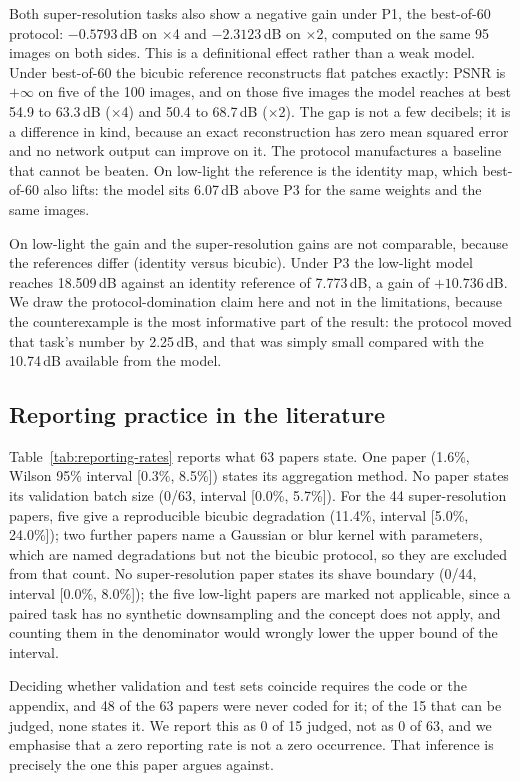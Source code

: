 \documentclass[10pt,twocolumn]{article}
\begin{document}
Both super-resolution tasks also show a negative gain under P1, the
best-of-60 protocol: $-0.5793$\,dB on $\times$4 and $-2.3123$\,dB on
$\times$2, computed on the same 95 images on both sides. This is a
definitional effect rather than a weak model. Under best-of-60 the bicubic
reference reconstructs flat patches exactly: PSNR is $+\infty$ on five of
the 100 images, and on those five images the model reaches at best 54.9 to
63.3\,dB ($\times$4) and 50.4 to 68.7\,dB ($\times$2). The gap is not a
few decibels; it is a difference in kind, because an exact reconstruction
has zero mean squared error and no network output can improve on it. The
protocol manufactures a baseline that cannot be beaten. On low-light the
reference is the identity map, which best-of-60 also lifts: the model sits
6.07\,dB above P3 for the same weights and the same images.

On low-light the gain and the super-resolution gains are not comparable,
because the references differ (identity versus bicubic). Under P3 the
low-light model reaches 18.509\,dB against an identity reference of
7.773\,dB, a gain of $+10.736$\,dB. We draw the protocol-domination claim
here and not in the limitations, because the counterexample is the most
informative part of the result: the protocol moved that task's number by
2.25\,dB, and that was simply small compared with the 10.74\,dB available
from the model.

\subsection{Reporting practice in the literature}

Table~\ref{tab:reporting-rates} reports what 63 papers state. One paper
(1.6\%, Wilson 95\% interval [0.3\%, 8.5\%]) states its aggregation method.
No paper states its validation batch size (0/63, interval [0.0\%, 5.7\%]).
For the 44 super-resolution papers, five give a reproducible bicubic
degradation (11.4\%, interval [5.0\%, 24.0\%]); two further papers name a
Gaussian or blur kernel with parameters, which are named degradations but
not the bicubic protocol, so they are excluded from that count. No
super-resolution paper states its shave boundary (0/44, interval [0.0\%,
8.0\%]); the five low-light papers are marked not applicable, since a
paired task has no synthetic downsampling and the concept does not apply,
and counting them in the denominator would wrongly lower the upper bound of
the interval.

Deciding whether validation and test sets coincide requires the code or the
appendix, and 48 of the 63 papers were never coded for it; of the 15 that
can be judged, none states it. We report this as 0 of 15 judged, not as 0 of
63, and we emphasise that a zero reporting rate is not a zero occurrence.
That inference is precisely the one this paper argues against.
\end{document}
